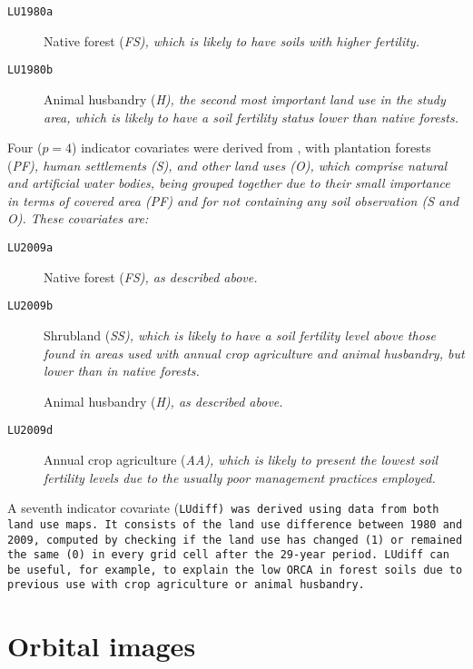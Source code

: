 \begin{description}
 \item[\tt{LU1980a}] Native forest (\it{FS}), which is likely to have soils with higher fertility.
  
 \item[\tt{LU1980b}] Animal husbandry (\it{H}), the second most important land use in the study area, which is
 likely to have a soil fertility status lower than native forests.
\end{description}

Four ($p = 4$) indicator covariates were derived from \landNew{}, with plantation forests (\it{PF}), human 
settlements (\it{S}), and other land uses (\it{O}), which comprise natural and artificial water bodies, being 
grouped together due to their small importance in terms of covered area (\it{PF}) and for not containing any 
soil observation (\it{S} and \it{O}). These covariates are:

\begin{description}
 \item[\tt{LU2009a}] Native forest (\it{FS}), as described above.
 
 \item[\tt{LU2009b}] Shrubland (\it{SS}), which is likely to have a soil fertility level above those found in
 areas used with annual crop agriculture and animal husbandry, but lower than in native forests.
 
 \item[] Animal husbandry (\it{H}), as described above.
  
 \item[\tt{LU2009d}] Annual crop agriculture (\it{AA}), which is likely to present the lowest soil fertility 
 levels due to the usually poor management practices employed.
\end{description}

A seventh indicator covariate (\tt{LUdiff}) was derived using data from both land use maps. It consists of the 
land use difference between \num{1980} and \num{2009}, computed by checking if the land use has changed (1) or 
remained the same (0) in every grid cell after the 29-year period. \tt{LUdiff} can be useful, for example, to 
explain the low \tt{ORCA} in forest soils due to previous use with crop agriculture or animal husbandry.

\tocless\section{Orbital images}
\label{sec:covar-data-sat-image}

